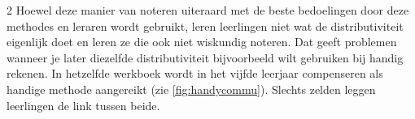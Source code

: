 \begin{multicols}{2}
Hoewel deze manier van noteren uiteraard met de beste bedoelingen door deze methodes en leraren wordt gebruikt, leren leerlingen niet wat de distributiviteit eigenlijk doet en leren ze die ook niet wiskundig noteren.
Dat geeft problemen wanneer je later diezelfde distributiviteit bijvoorbeeld wilt gebruiken bij handig rekenen.
In hetzelfde werkboek wordt in het vijfde leerjaar compenseren als handige methode aangereikt (zie \autoref{fig:handycommu}). Slechts zelden leggen leerlingen de link tussen beide.

\end{multicols}
